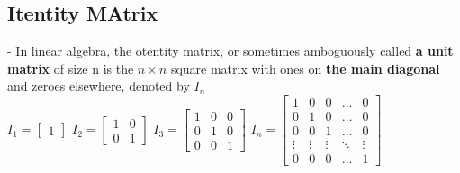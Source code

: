 \documentclass[12pt]{article}
\begin{document}
\subsection{Itentity MAtrix}
- In linear algebra, the otentity matrix, or sometimes amboguously called \textbf{a unit matrix} of size n is the $n \times n$ square matrix with ones on \textbf{the main diagonal} and zeroes elsewhere, denoted by $I_{n}$ \\
$I_{1} = 
\begin{bmatrix}
1
\end{bmatrix}$
\bigbreak
$I_{2} = 
\begin{bmatrix}
1 & 0 \\
0 & 1
\end{bmatrix}$
\bigbreak
$I_{3} = 
\begin{bmatrix}
1 & 0 & 0 \\
0 & 1 & 0 \\
0 & 0 & 1
\end{bmatrix}$
\bigbreak
$I_{n} = 
\begin{bmatrix}
1 & 0 & 0 & \ldots & 0 \\
0 & 1 & 0 & \ldots & 0 \\
0 & 0 & 1 & \ldots & 0 \\
\vdots & \vdots & \vdots & \ddots & \vdots \\
0 & 0 & 0 & \ldots & 1
\end{bmatrix}$
\end{document}
